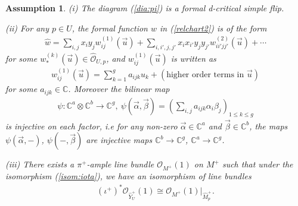 \documentclass[11pt]{amsart}
\theoremstyle{plain}
\newtheorem{assum}[thm]{Assumption}
\newcommand{\oO}{\mathcal{O}}
\begin{document}
\begin{assum}\label{assum:cond}
(i) The diagram (\ref{dia:pi})
is a formal d-critical simple flip. 

(ii) 
For any $p \in U$, 
the formal function 
$\widehat{w}$ in (\ref{relchart2}) is of the form 
\begin{align}\label{widew}
\widehat{w} 
=\sum_{i, j}x_i y_j w_{ij}^{(1)}(\vec{u})
+\sum_{i, i', j, j'}x_i x_{i'} y_j y_{j'} w_{i i' j j'}^{(2)}(\vec{u}) +\cdots
\end{align}
for some $w_{\ast}^{(k)}(\vec{u}) \in \widehat{\oO}_{U, p}$, and 
$w_{ij}^{(1)}(\vec{u})$ is written as 
\begin{align}\label{wij(1)}
w_{ij}^{(1)}(\vec{u})=\sum_{k=1}^g a_{ijk} u_k +
(\mbox{higher order terms in }\vec{u})
\end{align}
for some  $a_{ijk} \in \mathbb{C}$.
Moreover the bilinear map
\begin{align}\label{psi}
\psi \colon 
\mathbb{C}^a \otimes \mathbb{C}^b \to \mathbb{C}^g, \ 
\psi(\vec{\alpha}, \vec{\beta})=
\left(\sum_{i, j}a_{ijk}\alpha_i \beta_j \right)_{1\le k\le g}
\end{align}
is injective on each factor, i.e 
for any non-zero $\vec{\alpha} \in \mathbb{C}^a$ 
and $\vec{\beta} \in\mathbb{C}^b$, 
the maps
$\psi(\vec{\alpha}, -)$, $\psi(-, \vec{\beta})$ are injective 
maps $\mathbb{C}^b \to \mathbb{C}^g$, 
$\mathbb{C}^a \to \mathbb{C}^g$. 

(iii) There exists a $\pi^{+}$-ample line bundle
$\oO_{M^+}(1)$ on $M^+$ 
such that
under the isomorphism (\ref{isom:iota}), we 
have an isomorphism 
of line bundles 
\begin{align}\label{isom:line}
(\iota^{+})^{\ast}\oO_{\widehat{Y}_U^{+}}(1) \cong \oO_{M^{+}}(1)|_{\widehat{M}_p^+}.
\end{align}
\end{assum}
\end{document}
